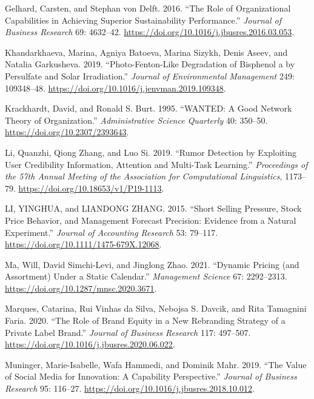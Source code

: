 \documentclass[
  12pt,
]{article}
\newlength{\cslhangindent}
\newenvironment{CSLReferences}[2] %
 {\begin{list}{}{%
  \setlength{\itemindent}{0pt}
  \setlength{\leftmargin}{0pt}
  \setlength{\parsep}{0pt}
  \ifodd #1
   \setlength{\leftmargin}{\cslhangindent}
   \setlength{\itemindent}{-1\cslhangindent}
  \fi
  \setlength{\itemsep}{#2\baselineskip}}}
 {\end{list}}
\begin{document}
\begin{CSLReferences}{1}{0}
Gelhard, Carsten, and Stephan von Delft. 2016. {``The Role of
Organizational Capabilities in Achieving Superior Sustainability
Performance.''} \emph{Journal of Business Research} 69: 4632--42.
\url{https://doi.org/10.1016/j.jbusres.2016.03.053}.

Khandarkhaeva, Marina, Agniya Batoeva, Marina Sizykh, Denis Aseev, and
Natalia Garkusheva. 2019. {``Photo-Fenton-Like Degradation of Bisphenol
a by Persulfate and Solar Irradiation.''} \emph{Journal of Environmental
Management} 249: 109348--48.
\url{https://doi.org/10.1016/j.jenvman.2019.109348}.

Krackhardt, David, and Ronald S. Burt. 1995. {``WANTED: A Good Network
Theory of Organization.''} \emph{Administrative Science Quarterly} 40:
350--50. \url{https://doi.org/10.2307/2393643}.

Li, Quanzhi, Qiong Zhang, and Luo Si. 2019. {``Rumor Detection by
Exploiting User Credibility Information, Attention and Multi-Task
Learning.''} \emph{Proceedings of the 57th Annual Meeting of the
Association for Computational Linguistics}, 1173--79.
\url{https://doi.org/10.18653/v1/P19-1113}.

LI, YINGHUA, and LIANDONG ZHANG. 2015. {``Short Selling Pressure, Stock
Price Behavior, and Management Forecast Precision: Evidence from a
Natural Experiment.''} \emph{Journal of Accounting Research} 53:
79--117. \url{https://doi.org/10.1111/1475-679X.12068}.

Ma, Will, David Simchi-Levi, and Jinglong Zhao. 2021. {``Dynamic Pricing
(and Assortment) Under a Static Calendar.''} \emph{Management Science}
67: 2292--2313. \url{https://doi.org/10.1287/mnsc.2020.3671}.

Marques, Catarina, Rui Vinhas da Silva, Nebojsa S. Davcik, and Rita
Tamagnini Faria. 2020. {``The Role of Brand Equity in a New Rebranding
Strategy of a Private Label Brand.''} \emph{Journal of Business
Research} 117: 497--507.
\url{https://doi.org/10.1016/j.jbusres.2020.06.022}.

Muninger, Marie-Isabelle, Wafa Hammedi, and Dominik Mahr. 2019. {``The
Value of Social Media for Innovation: A Capability Perspective.''}
\emph{Journal of Business Research} 95: 116--27.
\url{https://doi.org/10.1016/j.jbusres.2018.10.012}.


\end{CSLReferences}
\end{document}

